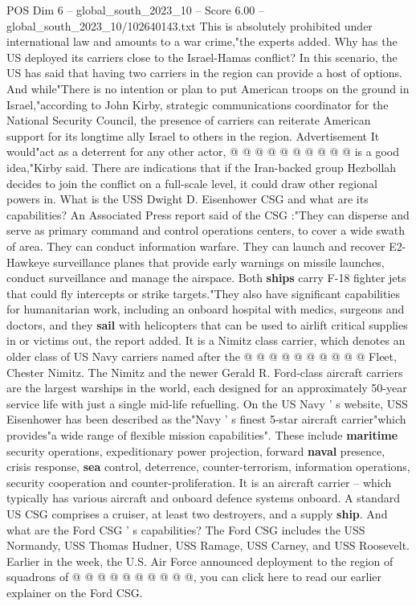 \begin{textsample}{POS Dim 6 – global\_south\_2023\_10 – Score 6.00 – global\_south\_2023\_10/102640143.txt}
This is absolutely prohibited under international law and amounts to a war crime,"the experts added.
Why has the US deployed its carriers close to the Israel-Hamas conflict?
In this scenario, the US has said that having two carriers in the region can provide a host of options.
And while"There is no intention or plan to put American troops on the ground in Israel,"according to John Kirby, strategic communications coordinator for the National Security Council, the presence of carriers can reiterate American support for its longtime ally Israel to others in the region.
Advertisement It would"act as a deterrent for any other actor, @ @ @ @ @ @ @ @ @ @ is a good idea,"Kirby said.
There are indications that if the Iran-backed group Hezbollah decides to join the conflict on a full-scale level, it could draw other regional powers in.
What is the USS Dwight D.
Eisenhower CSG and what are its capabilities?
An Associated Press report said of the CSG :"They can disperse and serve as primary command and control operations centers, to cover a wide swath of area.
They can conduct information warfare.
They can launch and recover E2-Hawkeye surveillance planes that provide early warnings on missile launches, conduct surveillance and manage the airspace.
Both \textbf{ships} carry F-18 fighter jets that could fly intercepts or strike targets."They also have significant capabilities for humanitarian work, including an onboard hospital with medics, surgeons and doctors, and they \textbf{sail} with helicopters that can be used to airlift critical supplies in or victims out, the report added.
It is a Nimitz class carrier, which denotes an older class of US Navy carriers named after the @ @ @ @ @ @ @ @ @ @ Fleet, Chester Nimitz.
The Nimitz and the newer Gerald R.
Ford-class aircraft carriers are the largest warships in the world, each designed for an approximately 50-year service life with just a single mid-life refuelling.
On the US Navy ' s website, USS Eisenhower has been described as the"Navy ' s finest 5-star aircraft carrier"which provides"a wide range of flexible mission capabilities".
These include \textbf{maritime} security operations, expeditionary power projection, forward \textbf{naval} presence, crisis response, \textbf{sea} control, deterrence, counter-terrorism, information operations, security cooperation and counter-proliferation.
It is an aircraft carrier -- which typically has various aircraft and onboard defence systems onboard.
A standard US CSG comprises a cruiser, at least two destroyers, and a supply \textbf{ship}.
And what are the Ford CSG ' s capabilities?
The Ford CSG includes the USS Normandy, USS Thomas Hudner, USS Ramage, USS Carney, and USS Roosevelt.
Earlier in the week, the U.S.
Air Force announced deployment to the region of squadrons of @ @ @ @ @ @ @ @ @ @, you can click here to read our earlier explainer on the Ford CSG.

\end{textsample}
